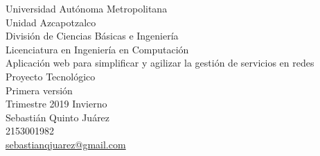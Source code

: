 \begin{titlepage}


\vspace*{\fill} %
  
\center %

\Large Universidad Autónoma Metropolitana\\
\large {Unidad Azcapotzalco}\\
\normalsize
División de Ciencias Básicas e Ingeniería\\
Licenciatura en Ingeniería en Computación\\[2cm] 

\large {Aplicación web para simplificar y agilizar la gestión de servicios en redes}\\
Proyecto Tecnol\'ogico\\[0.2cm]
Primera versión\\[0.2cm]
Trimestre 2019 Invierno\\[2cm] %

Sebastián Quinto Juárez \\ %
2153001982\\%
\href{mailto:al222222222@azc.uam.mx}{sebastianqjuarez@gmail.com}%
\\[2cm]


\end{titlepage}
